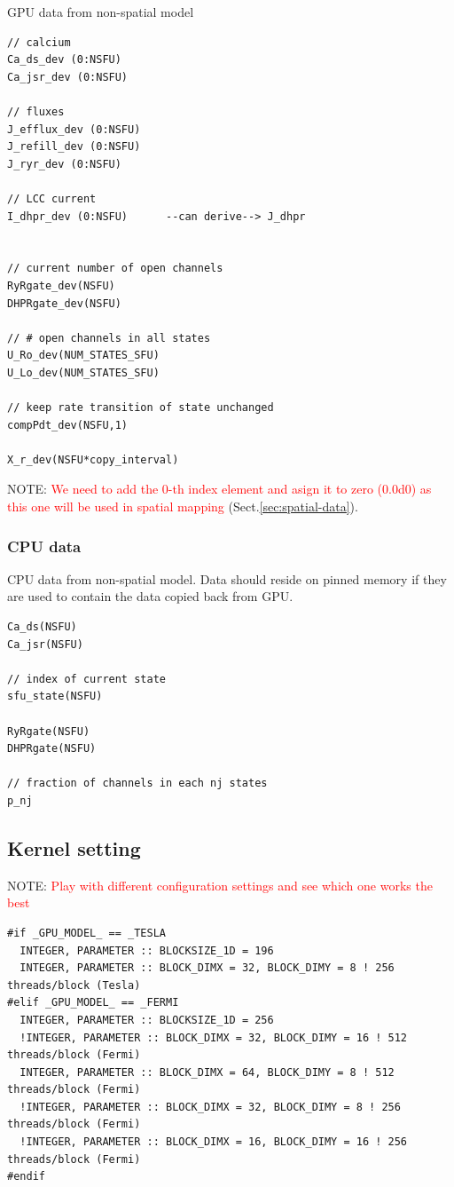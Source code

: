GPU data from non-spatial model 
\begin{lstlisting}
// calcium
Ca_ds_dev (0:NSFU)
Ca_jsr_dev (0:NSFU)

// fluxes
J_efflux_dev (0:NSFU)
J_refill_dev (0:NSFU)
J_ryr_dev (0:NSFU)

// LCC current
I_dhpr_dev (0:NSFU)      --can derive--> J_dhpr


// current number of open channels
RyRgate_dev(NSFU)
DHPRgate_dev(NSFU)

// # open channels in all states
U_Ro_dev(NUM_STATES_SFU)
U_Lo_dev(NUM_STATES_SFU)

// keep rate transition of state unchanged
compPdt_dev(NSFU,1)

X_r_dev(NSFU*copy_interval)
\end{lstlisting}

NOTE: \textcolor{red}{We need to add the 0-th index element and asign it
to zero (0.0d0) as this one will be used in spatial mapping}
(Sect.\ref{sec:spatial-data}).


\subsubsection{CPU data}
\label{sec:cpu-data}


CPU data from non-spatial model. Data should reside on pinned memory if they are
used to contain the data copied back from GPU. 

\begin{lstlisting}
Ca_ds(NSFU)
Ca_jsr(NSFU)

// index of current state
sfu_state(NSFU)

RyRgate(NSFU)
DHPRgate(NSFU)

// fraction of channels in each nj states
p_nj

\end{lstlisting}




\subsection{Kernel setting}
\label{sec:kernel-setting}

NOTE: \textcolor{red}{Play with different configuration settings and see which
one works the best}
\begin{lstlisting}
#if _GPU_MODEL_ == _TESLA
  INTEGER, PARAMETER :: BLOCKSIZE_1D = 196
  INTEGER, PARAMETER :: BLOCK_DIMX = 32, BLOCK_DIMY = 8 ! 256 threads/block (Tesla)
#elif _GPU_MODEL_ == _FERMI  
  INTEGER, PARAMETER :: BLOCKSIZE_1D = 256
  !INTEGER, PARAMETER :: BLOCK_DIMX = 32, BLOCK_DIMY = 16 ! 512 threads/block (Fermi)
  INTEGER, PARAMETER :: BLOCK_DIMX = 64, BLOCK_DIMY = 8 ! 512 threads/block (Fermi)
  !INTEGER, PARAMETER :: BLOCK_DIMX = 32, BLOCK_DIMY = 8 ! 256 threads/block (Fermi)
  !INTEGER, PARAMETER :: BLOCK_DIMX = 16, BLOCK_DIMY = 16 ! 256 threads/block (Fermi)
#endif
\end{lstlisting}

